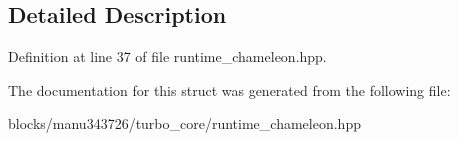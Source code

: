 \subsection{Detailed Description}


Definition at line 37 of file runtime\+\_\+chameleon.\+hpp.



The documentation for this struct was generated from the following file\+:\begin{DoxyCompactItemize}
\item 
blocks/manu343726/turbo\+\_\+core/runtime\+\_\+chameleon.\+hpp\end{DoxyCompactItemize}
